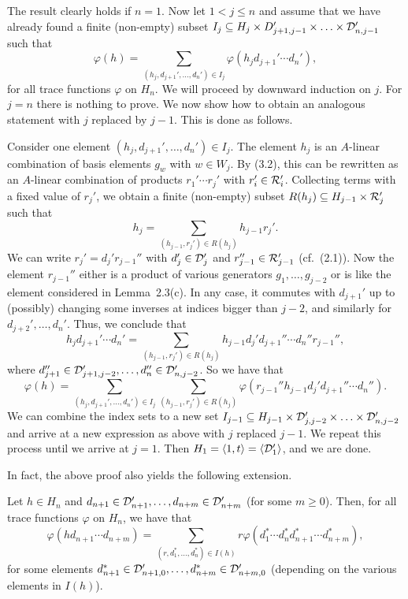 \begin{pf}
The result clearly holds  if $n=1$. Now  let  $1<j \leq n$ and  assume
that we have already found  a finite (non-empty) subset $I_j \subseteq
H_j \times D_{j+1,j-1}' \times  \ldots \times {\cal D}_{n,j-1}'$  such
that \[ \varphi(h)= \sum_{(h_j,d_{j+1}',\ldots,d_n') \in I_j} 
\varphi(h_jd_{j+1}' \cdots d_{n}'),\]
for  all trace  functions $\varphi$  on    $H_n$. We will  proceed  by
downward induction on $j$. For $j=n$ there is nothing to prove. We now
show  how to   obtain an  analogous   statement with  $j$ replaced  by
$j-1$. This is done as follows.

Consider one element  $(h_j,d_{j+1}',  \ldots,d_n') \in  I_j$. The
element $h_j$ is an $A$-linear combination of basis elements $g_w$
with $w \in W_j$. By (3.2), this can be rewritten as an $A$-linear
combination of products $r_1' \cdots r_j'$ with $r_i' \in {\cal R}_i'$.
Collecting terms with a fixed value of $r_j'$, we obtain a finite 
(non-empty) subset   $R(h_j) \subseteq H_{j-1}  \times {\cal  R}_j'$   
such  that \[h_j=\sum_{(h_{j-1},r_j')  \in R(h_j)} h_{j-1}r_j'.\] 
We  can write $r_j'=d_j'r_{j-1}''$   with  $d_j' \in  {\cal D}_j'$  
and $r_{j-1}'' \in {\cal R}_{j-1}'$ (cf.\  (2.1)). Now  the element 
$r_{j-1}''$ either is a product of various generators $g_1,\ldots,g_{j-2}$
or is like the element considered in Lemma~2.3(c). In any case,  it 
commutes with $d_{j+1}'$ up to (possibly) changing some inverses at 
indices bigger than $j-2$, and similarly for $d_{j+2}',\ldots,d_{n}'$. 
Thus, we conclude that 
\[ h_jd_{j+1}'\cdots d_n' = \sum_{(h_{j-1},r_j') \in R(h_j)} 
h_{j-1}d_j'd_{j+1}'' \cdots d_n''r_{j-1}'',\] where $d_{j+1}'' \in   
{\cal D}_{j+1,j-2}',\ldots,d_n'' \in {\cal D}_{n,j-2}'$. 
So we have that \[\varphi(h)=\sum_{(h_j,d_{j+1}',\ldots,d_n') \in I_j}
\sum_{(h_{j-1},r_j') \in R(h_j)} \varphi(r_{j-1}''h_{j-1}d_j'd_{j+1}''
\cdots d_n'').\]  We  can combine the index   sets to a  new  set  
$I_{j-1}  \subseteq H_{j-1}  \times {\cal D}_{j,j-2}' \times \ldots 
\times  {\cal D}_{n,j-2}'$ and arrive  at a new  expression  as above  
with  $j$ replaced  $j-1$.  We  repeat this process until  we  arrive 
at  $j=1$.  Then $H_1=\langle 1,  t \rangle= \langle {\cal D}_1' 
\rangle$, and we are done.  \end{pf}

In fact, the above proof also yields the following extension.

\begin{cor}
Let $h \in H_n$ and $d_{n+1} \in {\cal D}_{n+1}', \ldots, d_{n+m} \in 
{\cal D}_{n+m}'$ (for some $m \geq 0$). Then, for all trace functions
$\varphi$ on $H_n$, we have that
\[\varphi(hd_{n+1} \cdots d_{n+m})=\sum_{(r,d_1^{*},\ldots,d_n^{*}) \in I(h)} 
r\varphi(d_1^{*} \cdots d_n^{*}d_{n+1}^{*} \cdots d_{n+m}^{*}),\]
for some elements $d_{n+1}^{*} \in {\cal D}_{n+1,0}',\ldots,
d_{n+m}^{*} \in {\cal D}_{n+m,0}'$ (depending on the various elements in 
$I(h)$).
\end{cor}

